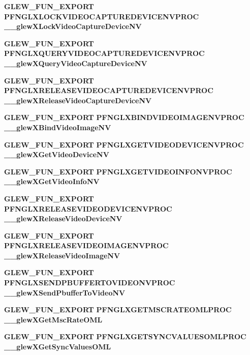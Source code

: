 \begin{DoxyCompactItemize}
\item 
{\bf G\+L\+E\+W\+\_\+\+F\+U\+N\+\_\+\+E\+X\+P\+O\+RT} {\bf P\+F\+N\+G\+L\+X\+L\+O\+C\+K\+V\+I\+D\+E\+O\+C\+A\+P\+T\+U\+R\+E\+D\+E\+V\+I\+C\+E\+N\+V\+P\+R\+OC} {\bf \+\_\+\+\_\+glew\+X\+Lock\+Video\+Capture\+Device\+NV}
\item 
{\bf G\+L\+E\+W\+\_\+\+F\+U\+N\+\_\+\+E\+X\+P\+O\+RT} {\bf P\+F\+N\+G\+L\+X\+Q\+U\+E\+R\+Y\+V\+I\+D\+E\+O\+C\+A\+P\+T\+U\+R\+E\+D\+E\+V\+I\+C\+E\+N\+V\+P\+R\+OC} {\bf \+\_\+\+\_\+glew\+X\+Query\+Video\+Capture\+Device\+NV}
\item 
{\bf G\+L\+E\+W\+\_\+\+F\+U\+N\+\_\+\+E\+X\+P\+O\+RT} {\bf P\+F\+N\+G\+L\+X\+R\+E\+L\+E\+A\+S\+E\+V\+I\+D\+E\+O\+C\+A\+P\+T\+U\+R\+E\+D\+E\+V\+I\+C\+E\+N\+V\+P\+R\+OC} {\bf \+\_\+\+\_\+glew\+X\+Release\+Video\+Capture\+Device\+NV}
\item 
{\bf G\+L\+E\+W\+\_\+\+F\+U\+N\+\_\+\+E\+X\+P\+O\+RT} {\bf P\+F\+N\+G\+L\+X\+B\+I\+N\+D\+V\+I\+D\+E\+O\+I\+M\+A\+G\+E\+N\+V\+P\+R\+OC} {\bf \+\_\+\+\_\+glew\+X\+Bind\+Video\+Image\+NV}
\item 
{\bf G\+L\+E\+W\+\_\+\+F\+U\+N\+\_\+\+E\+X\+P\+O\+RT} {\bf P\+F\+N\+G\+L\+X\+G\+E\+T\+V\+I\+D\+E\+O\+D\+E\+V\+I\+C\+E\+N\+V\+P\+R\+OC} {\bf \+\_\+\+\_\+glew\+X\+Get\+Video\+Device\+NV}
\item 
{\bf G\+L\+E\+W\+\_\+\+F\+U\+N\+\_\+\+E\+X\+P\+O\+RT} {\bf P\+F\+N\+G\+L\+X\+G\+E\+T\+V\+I\+D\+E\+O\+I\+N\+F\+O\+N\+V\+P\+R\+OC} {\bf \+\_\+\+\_\+glew\+X\+Get\+Video\+Info\+NV}
\item 
{\bf G\+L\+E\+W\+\_\+\+F\+U\+N\+\_\+\+E\+X\+P\+O\+RT} {\bf P\+F\+N\+G\+L\+X\+R\+E\+L\+E\+A\+S\+E\+V\+I\+D\+E\+O\+D\+E\+V\+I\+C\+E\+N\+V\+P\+R\+OC} {\bf \+\_\+\+\_\+glew\+X\+Release\+Video\+Device\+NV}
\item 
{\bf G\+L\+E\+W\+\_\+\+F\+U\+N\+\_\+\+E\+X\+P\+O\+RT} {\bf P\+F\+N\+G\+L\+X\+R\+E\+L\+E\+A\+S\+E\+V\+I\+D\+E\+O\+I\+M\+A\+G\+E\+N\+V\+P\+R\+OC} {\bf \+\_\+\+\_\+glew\+X\+Release\+Video\+Image\+NV}
\item 
{\bf G\+L\+E\+W\+\_\+\+F\+U\+N\+\_\+\+E\+X\+P\+O\+RT} {\bf P\+F\+N\+G\+L\+X\+S\+E\+N\+D\+P\+B\+U\+F\+F\+E\+R\+T\+O\+V\+I\+D\+E\+O\+N\+V\+P\+R\+OC} {\bf \+\_\+\+\_\+glew\+X\+Send\+Pbuffer\+To\+Video\+NV}
\item 
{\bf G\+L\+E\+W\+\_\+\+F\+U\+N\+\_\+\+E\+X\+P\+O\+RT} {\bf P\+F\+N\+G\+L\+X\+G\+E\+T\+M\+S\+C\+R\+A\+T\+E\+O\+M\+L\+P\+R\+OC} {\bf \+\_\+\+\_\+glew\+X\+Get\+Msc\+Rate\+O\+ML}
\item 
{\bf G\+L\+E\+W\+\_\+\+F\+U\+N\+\_\+\+E\+X\+P\+O\+RT} {\bf P\+F\+N\+G\+L\+X\+G\+E\+T\+S\+Y\+N\+C\+V\+A\+L\+U\+E\+S\+O\+M\+L\+P\+R\+OC} {\bf \+\_\+\+\_\+glew\+X\+Get\+Sync\+Values\+O\+ML}

\end{DoxyCompactItemize}

